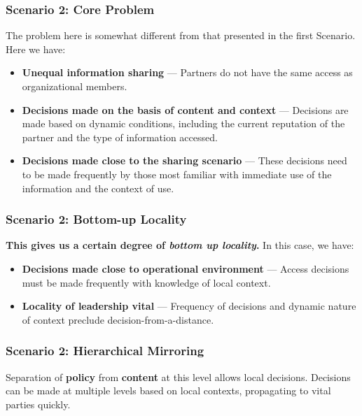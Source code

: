 \documentclass[t,handout, 10pt]{beamer}
\begin{document}
\begin{frame}
\frametitle{Scenario 2: Core Problem}
The problem here is somewhat different from that presented in the first Scenario.
\newline
\newline
\pause
Here we have:
\begin{itemize}
\item \textbf{Unequal information sharing} ---  Partners do not have the same access as organizational members.
\item \textbf{Decisions made on the basis of content and context} --- Decisions are made based on dynamic conditions, including the current reputation of the partner and the type of information accessed.
\item \textbf{Decisions made close to the sharing scenario} --- These decisions need to be made frequently by those most familiar with immediate use of the information and the context of use.
\end{itemize}
\end{frame}

\begin{frame}
\frametitle{Scenario 2: Bottom-up Locality}
\textbf{This gives us a certain degree of \textit{bottom up locality}.}
\newline
\newline
\pause
In this case, we have:
\pause
\begin{itemize}
\item \textbf{Decisions made close to operational environment} --- Access decisions must be made frequently with knowledge of local context.
\pause
\item \textbf{Locality of leadership vital} --- Frequency of decisions and dynamic nature of context preclude decision-from-a-distance.
\end{itemize}
\end{frame}

\begin{frame}
\frametitle{Scenario 2: Hierarchical Mirroring}
Separation of \textbf{policy} from \textbf{content} at this level allows local decisions.
\newline
\newline
Decisions can be made at multiple levels based on local contexts, propagating to vital parties quickly.
\pause
\end{frame}
\end{document}
